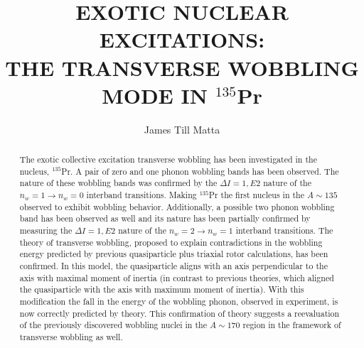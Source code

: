 \documentclass[final,numrefs,sort&compress]{nddiss2e}
\newcommand{\pr}{$^{135}$Pr}
\begin{document}
\frontmatter 
\title{EXOTIC NUCLEAR EXCITATIONS:\\
THE TRANSVERSE WOBBLING MODE IN \pr{}}
\author{James Till Matta}

\maketitle
%
%

\makecopyright

\begin{abstract}
The exotic collective excitation transverse wobbling has been investigated in the nucleus, \pr{}. A pair of zero and one phonon wobbling bands has been observed. The nature of these wobbling bands was confirmed by the $\Delta{}I=1, E2$ nature of the $n_w=1\rightarrow n_w=0$ interband transitions. Making \pr{} the first nucleus in the $A\sim{}135$ observed to exhibit wobbling behavior. Additionally, a possible two phonon wobbling band has been observed as well and its nature has been partially confirmed by measuring the $\Delta{}I=1, E2$ nature of the $n_w=2\rightarrow n_w=1$ interband transitions. The theory of transverse wobbling, proposed to explain contradictions in the wobbling energy predicted by previous quasiparticle plus triaxial rotor calculations, has been confirmed. In this model, the quasiparticle aligns with an axis perpendicular to the axis with maximal moment of inertia (in contrast to previous theories, which aligned the quasiparticle with the axis with maximum moment of inertia). With this modification the fall in the energy of the wobbling phonon, observed in experiment, is now correctly predicted by theory. This confirmation of theory suggests a reevaluation of the previously discovered wobbling nuclei in the $A\sim{}170$ region in the framework of transverse wobbling as well.
\end{abstract}

\renewcommand{\dedicationname}{DEDICATED TO:}
\end{document}
